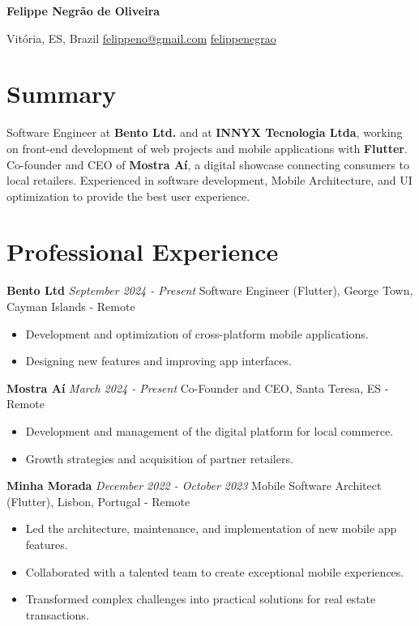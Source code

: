\documentclass[10pt, letterpaper]{article}
\begin{document}
\begin{center}
    {\fontsize{30 pt}{30 pt} \textbf{Felippe Negr\~{a}o de Oliveira}}
    
    \vspace{0.3 cm}
    
    {Vit\'oria, ES, Brazil \quad \faEnvelope[regular] \href{mailto:felippeno@gmail.com}{felippeno@gmail.com} \quad \faLinkedin \href{https://linkedin.com/in/felippenegrao}{felippenegrao}} 
\end{center}

\section{Summary}
Software Engineer at \textbf{Bento Ltd.} and at \textbf{INNYX Tecnologia Ltda}, working on front-end development of web projects and mobile applications with \textbf{Flutter}. Co-founder and CEO of \textbf{Mostra A\'i}, a digital showcase connecting consumers to local retailers. Experienced in software development, Mobile Architecture, and UI optimization to provide the best user experience.

\section{Professional Experience}
\textbf{Bento Ltd} \hfill \textit{September 2024 - Present}\newline
Software Engineer (Flutter), George Town, Cayman Islands - Remote
\begin{itemize}
    \item Development and optimization of cross-platform mobile applications.
    \item Designing new features and improving app interfaces.
\end{itemize}

\textbf{Mostra A\'i} \hfill \textit{March 2024 - Present}\newline
Co-Founder and CEO, Santa Teresa, ES - Remote
\begin{itemize}
    \item Development and management of the digital platform for local commerce.
    \item Growth strategies and acquisition of partner retailers.
\end{itemize}

\textbf{Minha Morada} \hfill \textit{December 2022 - October 2023}\newline
Mobile Software Architect (Flutter), Lisbon, Portugal - Remote
\begin{itemize}
    \item Led the architecture, maintenance, and implementation of new mobile app features.
    \item Collaborated with a talented team to create exceptional mobile experiences.
    \item Transformed complex challenges into practical solutions for real estate transactions.
\end{itemize}
\end{document}
